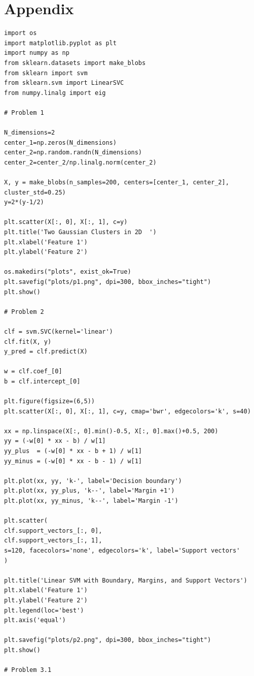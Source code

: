 \documentclass[11pt]{article}
\begin{document}
	\section*{Appendix}
	
	\vspace{1em}
	
	\begin{lstlisting}[style=matlabstyle,caption={Homework Code}]
import os
import matplotlib.pyplot as plt
import numpy as np
from sklearn.datasets import make_blobs
from sklearn import svm
from sklearn.svm import LinearSVC
from numpy.linalg import eig

# Problem 1

N_dimensions=2
center_1=np.zeros(N_dimensions)
center_2=np.random.randn(N_dimensions)
center_2=center_2/np.linalg.norm(center_2)

X, y = make_blobs(n_samples=200, centers=[center_1, center_2], cluster_std=0.25)
y=2*(y-1/2)

plt.scatter(X[:, 0], X[:, 1], c=y)
plt.title('Two Gaussian Clusters in 2D  ')
plt.xlabel('Feature 1')
plt.ylabel('Feature 2')

os.makedirs("plots", exist_ok=True)
plt.savefig("plots/p1.png", dpi=300, bbox_inches="tight")
plt.show()

# Problem 2

clf = svm.SVC(kernel='linear')
clf.fit(X, y)
y_pred = clf.predict(X)

w = clf.coef_[0]
b = clf.intercept_[0]

plt.figure(figsize=(6,5))
plt.scatter(X[:, 0], X[:, 1], c=y, cmap='bwr', edgecolors='k', s=40)

xx = np.linspace(X[:, 0].min()-0.5, X[:, 0].max()+0.5, 200)
yy = (-w[0] * xx - b) / w[1]
yy_plus  = (-w[0] * xx - b + 1) / w[1]
yy_minus = (-w[0] * xx - b - 1) / w[1]

plt.plot(xx, yy, 'k-', label='Decision boundary')
plt.plot(xx, yy_plus, 'k--', label='Margin +1')
plt.plot(xx, yy_minus, 'k--', label='Margin -1')

plt.scatter(
clf.support_vectors_[:, 0],
clf.support_vectors_[:, 1],
s=120, facecolors='none', edgecolors='k', label='Support vectors'
)

plt.title('Linear SVM with Boundary, Margins, and Support Vectors')
plt.xlabel('Feature 1')
plt.ylabel('Feature 2')
plt.legend(loc='best')
plt.axis('equal')

plt.savefig("plots/p2.png", dpi=300, bbox_inches="tight")
plt.show()

# Problem 3.1


\end{lstlisting}
\end{document}
